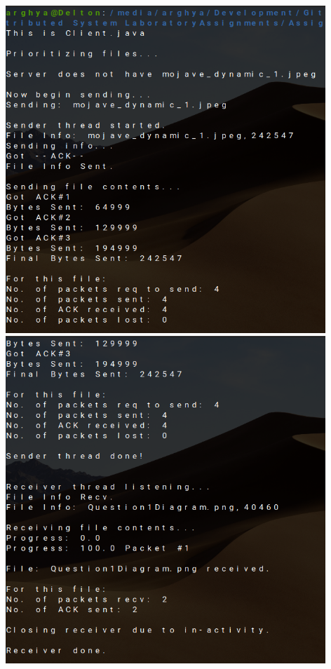 \documentclass{article}
\begin{document}
\includegraphics[height=350pt]{Output1}
\includegraphics[height=350pt]{Output2}
\end{document}
